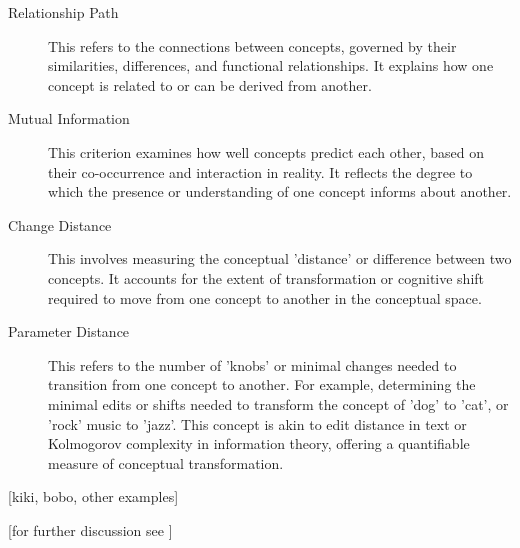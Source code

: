 \begin{description}
    \item [Relationship Path] This refers to the connections between concepts, governed by their similarities, differences, and functional relationships. It explains how one concept is related to or can be derived from another.
    \item [Mutual Information] This criterion examines how well concepts predict each other, based on their co-occurrence and interaction in reality. It reflects the degree to which the presence or understanding of one concept informs about another.
    \item [Change Distance] This involves measuring the conceptual 'distance' or difference between two concepts. It accounts for the extent of transformation or cognitive shift required to move from one concept to another in the conceptual space.
    \item [Parameter Distance] This refers to the number of 'knobs' or minimal changes needed to transition from one concept to another. For example, determining the minimal edits or shifts needed to transform the concept of 'dog' to 'cat', or 'rock' music to 'jazz'. This concept is akin to edit distance in text or Kolmogorov complexity in information theory, offering a quantifiable measure of conceptual transformation.
\end{description}


[kiki, bobo, other examples]

[for further discussion see ]


\subsubsection{}\label{sec:llm}


